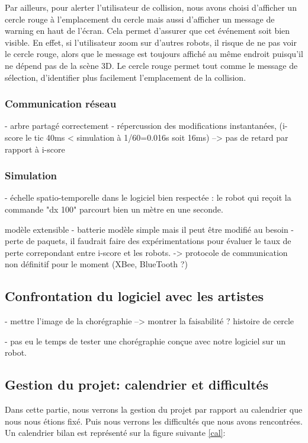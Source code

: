 Par ailleurs, pour alerter l'utilisateur de collision, nous avons choisi d'afficher un cercle rouge à l'emplacement du cercle mais aussi d'afficher un message de warning en haut de l'écran. Cela permet d'assurer que cet événement soit bien visible. En effet, si l'utilisateur zoom sur d'autres robots, il risque de ne pas voir le cercle rouge, alors que le message est toujours affiché au même endroit puisqu'il ne dépend pas de la scène 3D. Le cercle rouge permet tout comme le message de sélection, d'identifier plus facilement l'emplacement de la collision.

\subsubsection{Communication réseau}

- arbre partagé correctement
- répercussion des modifications instantanées, (i-score le tic 40ms < simulation à 1/60=0.016s soit 16ms)
--> pas de retard par rapport à i-score

\subsubsection{Simulation}

- échelle spatio-temporelle dans le logiciel bien respectée : le robot qui reçoit la commande "dx 100" parcourt bien un mètre en une seconde.

modèle extensible
- batterie modèle simple mais il peut être modifié au besoin
- perte de paquets, il faudrait faire des expérimentations pour évaluer le taux de perte correpondant entre i-score et les robots. -> protocole de communication non définitif pour le moment (XBee, BlueTooth ?)

\subsection{Confrontation du logiciel avec les artistes}

- mettre l'image de la chorégraphie
--> montrer la faisabilité ? histoire de cercle 

- pas eu le temps de tester une chorégraphie conçue avec notre logiciel sur un robot.


\subsection{Gestion du projet: calendrier et difficultés}

Dans cette partie, nous verrons la gestion du projet par rapport au calendrier que nous nous étions fixé. Puis nous verrons les difficultés que nous avons rencontrées. Un calendrier bilan est représenté sur la figure suivante \ref{cal}:

